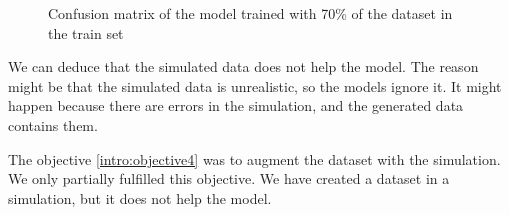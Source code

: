 \begin{figure}[H]
    \centering
    \qquad
    \caption{Confusion matrix of the model trained with 70\% of the dataset in the train set}
    \label{fig:augmented_confusion_matrix}
\end{figure}

We can deduce that the simulated data does not help the model. The reason might be that the simulated data is unrealistic, so the models ignore it. It might happen because there are errors in the simulation, and the generated data contains them.

The objective \ref{intro:objective4} was to augment the dataset with the simulation. We only partially fulfilled this objective. We have created a dataset in a simulation, but it does not help the model.

